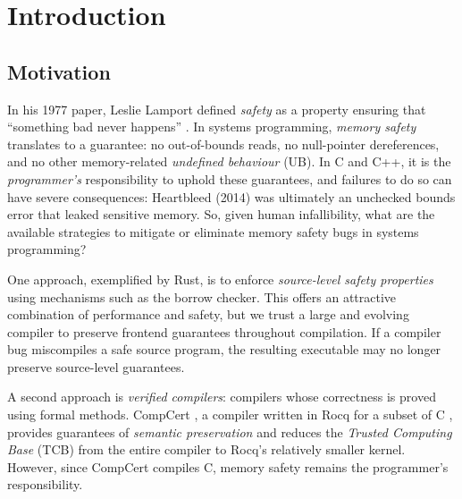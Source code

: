 

\chapter{Introduction}\label{ch:intro}

\section{Motivation}

In his 1977 paper, Leslie Lamport defined \emph{safety} as a property ensuring that ``something bad never happens'' \cite{Lamport1977Proving}. In systems programming, \emph{memory safety} translates to a guarantee: no out-of-bounds reads, no null-pointer dereferences, and no other memory-related \emph{undefined behaviour} (UB). In C and C++, it is the \emph{programmer's} responsibility to uphold these guarantees, and failures to do so can have severe consequences: Heartbleed (2014) \cite{CVE-2014-0160} was ultimately an unchecked bounds error that leaked sensitive memory. So, given human infallibility, what are the available strategies to mitigate or eliminate memory safety bugs in systems programming?

One approach, exemplified by Rust, is to enforce \emph{source-level safety properties} using mechanisms such as the borrow checker. This offers an attractive combination of performance and safety, but we trust a large and evolving compiler to preserve frontend guarantees throughout compilation. If a compiler bug miscompiles a safe source program, the resulting executable may no longer preserve source-level guarantees.

A second approach is \emph{verified compilers}: compilers whose correctness is proved using formal methods. CompCert \cite{compcert}, a compiler written in Rocq for a subset of C \cite{RocqRefman}, provides guarantees of \emph{semantic preservation} and reduces the \emph{Trusted Computing Base} (TCB) from the entire compiler to Rocq's relatively smaller kernel. However, since CompCert compiles C, memory safety remains the programmer's responsibility.


